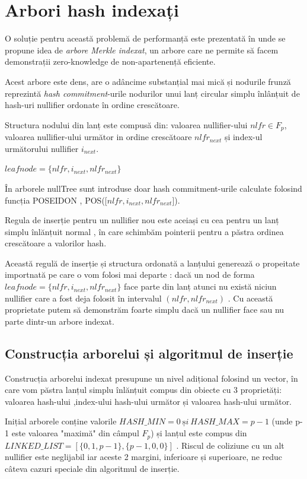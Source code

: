 \documentclass[12pt, letterpaper]{article}
\begin{document}
\section{Arbori hash indexați}
O soluție pentru această problemă de performanță este prezentată în \cite{cryptoeprint:2021/1263} unde se propune idea de \emph{arbore Merkle indexat}, un arbore care ne permite să facem demonstrații zero-knowledge de non-apartenență eficiente.

Acest arbore este dens, are o adâncime substanțial mai mică și nodurile frunză reprezintă \emph{hash commitment}-urile nodurilor unui lanț circular simplu înlânțuit de hash-uri nullifier ordonate în ordine crescătoare.

Structura nodului din lanț este compusă din: valoarea nullifier-ului $nlfr\in F_p$, valoarea nullifier-ului următor in ordine crescătoare $nlfr_{next}$ și index-ul următorului nullifier $i_{next}$.

\centering

$leafnode = \{nlfr, i_{next}, nlfr_{next}\}$

\raggedright

În arborele nullTree sunt introduse doar hash commitment-urile calculate folosind funcția POSEIDON , POS([$nlfr, i_{next}, nlfr_{next}$]).

Regula de inserție pentru un nullifier nou este aceiași cu cea pentru un lanț simplu înlănțuit normal , în care schimbăm pointerii pentru a păstra ordinea crescătoare a valorilor hash. 

Această regulă de inserție și structura ordonată a lanțului generează o propeitate importnată pe care o vom folosi mai departe : dacă un nod de forma $leafnode = \{nlfr, i_{next}, nlfr_{next}\}$ face parte din lanț atunci nu există niciun nullifier care a fost deja folosit în intervalul $(nlfr,nlfr_{next})$ .
Cu această proprietate putem să demonstrăm foarte simplu dacă un nullifier face sau nu parte dintr-un arbore indexat.

\subsection{Construcția arborelui și algoritmul de inserție}

Construcția arborelui indexat presupune un nivel adițional folosind un vector, în care vom păstra lanțul simplu înlănțuit compus din obiecte cu 3 proprietăți: valoarea hash-ului ,index-ului hash-ului următor și valoarea hash-ului următor.

Inițial arborele conține valorile $HASH\_MIN=0\ și\ HASH\_MAX=p-1$ (unde p-1 este valoarea "maximă" din câmpul $F_p$) și lanțul este compus din $LINKED\_LIST=[\{0,1,p-1\},\{p-1,0,0\}]$ . Riscul de coliziune cu un alt nullifier este neglijabil iar aceste 2 margini, inferioare și superioare, ne reduc câteva cazuri speciale din algoritmul de inserție. 
\end{document}
